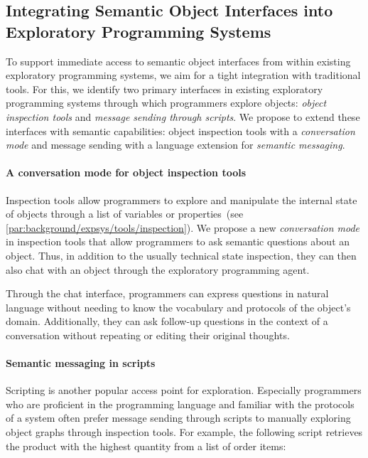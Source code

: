 \subsection*{Integrating Semantic Object Interfaces into Exploratory Programming Systems}
\label{sec:design/agent/interfaces}

To support immediate access to semantic object interfaces from within existing exploratory programming systems, we aim for a tight integration with traditional tools.
For this, we identify two primary interfaces in existing exploratory programming systems through which programmers explore objects: \emph{object inspection tools} and \emph{message sending through scripts}.
We propose to extend these interfaces with semantic capabilities: object inspection tools with a \emph{conversation mode} and message sending with a language extension for \emph{semantic messaging}.

\paragraph{A conversation mode for object inspection tools}
\label{par:design/agent/interfaces/inspector}

Inspection tools allow programmers to explore and manipulate the internal state of objects through a list of variables or properties~(see \cref{par:background/expsys/tools/inspection}).
We propose a new \emph{conversation mode} in inspection tools that allow programmers to ask semantic questions about an object.
Thus, in addition to the usually technical state inspection, they can then also chat with an object through the exploratory programming agent.

Through the chat interface, programmers can express questions in natural language without needing to know the vocabulary and protocols of the object's domain.
Additionally, they can ask follow-up questions in the context of a conversation without repeating or editing their original thoughts.

\paragraph{Semantic messaging in scripts}
\label{par:design/agent/interfaces/messaging}

Scripting is another popular access point for exploration.
Especially programmers who are proficient in the programming language and familiar with the protocols of a system often prefer message sending through scripts to manually exploring object graphs through inspection tools.
For example, the following script retrieves the product with the highest quantity from a list of order items:

